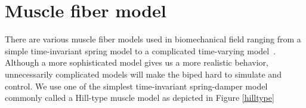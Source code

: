 \documentclass[master,english,final]{kaist-ucs}
\begin{document}


\section{Muscle fiber model}

There are various muscle fiber models used in biomechanical field ranging
from a simple time-invariant spring model to a complicated time-varying model~\cite{25733}.
Although a more sophisticated model gives us a more realistic behavior, unnecessarily
complicated models will make the biped hard to simulate and control.
We use one of the simplest time-invariant spring-damper model commonly called
a Hill-type muscle model \cite{hill} as depicted in Figure \ref{hilltype}
\end{document}
